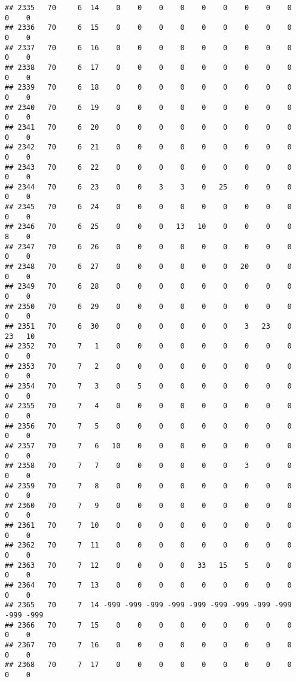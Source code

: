 \documentclass[]{article}
\begin{document}
\begin{verbatim}
## 2335   70     6  14    0    0    0    0    0    0    0    0    0    0    0
## 2336   70     6  15    0    0    0    0    0    0    0    0    0    0    0
## 2337   70     6  16    0    0    0    0    0    0    0    0    0    0    0
## 2338   70     6  17    0    0    0    0    0    0    0    0    0    0    0
## 2339   70     6  18    0    0    0    0    0    0    0    0    0    0    0
## 2340   70     6  19    0    0    0    0    0    0    0    0    0    0    0
## 2341   70     6  20    0    0    0    0    0    0    0    0    0    0    0
## 2342   70     6  21    0    0    0    0    0    0    0    0    0    0    0
## 2343   70     6  22    0    0    0    0    0    0    0    0    0    0    0
## 2344   70     6  23    0    0    3    3    0   25    0    0    0    0    0
## 2345   70     6  24    0    0    0    0    0    0    0    0    0    0    0
## 2346   70     6  25    0    0    0   13   10    0    0    0    0    8    0
## 2347   70     6  26    0    0    0    0    0    0    0    0    0    0    0
## 2348   70     6  27    0    0    0    0    0    0   20    0    0    0    0
## 2349   70     6  28    0    0    0    0    0    0    0    0    0    0    0
## 2350   70     6  29    0    0    0    0    0    0    0    0    0    0    0
## 2351   70     6  30    0    0    0    0    0    0    3   23    0   23   10
## 2352   70     7   1    0    0    0    0    0    0    0    0    0    0    0
## 2353   70     7   2    0    0    0    0    0    0    0    0    0    0    0
## 2354   70     7   3    0    5    0    0    0    0    0    0    0    0    0
## 2355   70     7   4    0    0    0    0    0    0    0    0    0    0    0
## 2356   70     7   5    0    0    0    0    0    0    0    0    0    0    0
## 2357   70     7   6   10    0    0    0    0    0    0    0    0    0    0
## 2358   70     7   7    0    0    0    0    0    0    3    0    0    0    0
## 2359   70     7   8    0    0    0    0    0    0    0    0    0    0    0
## 2360   70     7   9    0    0    0    0    0    0    0    0    0    0    0
## 2361   70     7  10    0    0    0    0    0    0    0    0    0    0    0
## 2362   70     7  11    0    0    0    0    0    0    0    0    0    0    0
## 2363   70     7  12    0    0    0    0   33   15    5    0    0    0    0
## 2364   70     7  13    0    0    0    0    0    0    0    0    0    0    0
## 2365   70     7  14 -999 -999 -999 -999 -999 -999 -999 -999 -999 -999 -999
## 2366   70     7  15    0    0    0    0    0    0    0    0    0    0    0
## 2367   70     7  16    0    0    0    0    0    0    0    0    0    0    0
## 2368   70     7  17    0    0    0    0    0    0    0    0    0    0    0

\end{verbatim}
\end{document}
